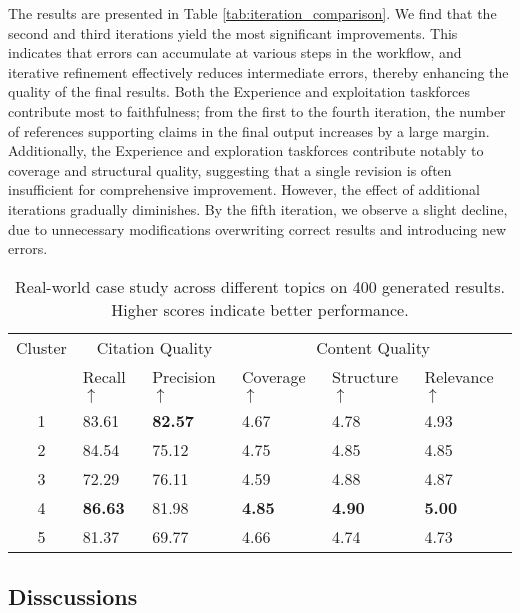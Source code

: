 \documentclass[manuscript,review,anonymous]{acmart}
\begin{document}
The results are presented in Table \ref{tab:iteration_comparison}. We find that the second and third iterations yield the most significant improvements. This indicates that errors can accumulate at various steps in the workflow, and iterative refinement effectively reduces intermediate errors, thereby enhancing the quality of the final results. Both the Experience and exploitation taskforces contribute most to faithfulness; from the first to the fourth iteration, the number of references supporting claims in the final output increases by a large margin. Additionally, the Experience and exploration taskforces contribute notably to coverage and structural quality, suggesting that a single revision is often insufficient for comprehensive improvement. However, the effect of additional iterations gradually diminishes. By the fifth iteration, we observe a slight decline, due to unnecessary modifications overwriting correct results and introducing new errors.

\begin{table}[]
    \centering
    \begin{tabular}{clllll}
    \toprule
    \multirow{2.5}{*}{Cluster} & \multicolumn{2}{c}{Citation Quality} & \multicolumn{3}{c}{Content Quality} \\
    \cmidrule(lr){2-3} \cmidrule(lr){4-6}
    & Recall $\uparrow$ & Precision $\uparrow$ & Coverage $\uparrow$ & Structure $\uparrow$ & Relevance $\uparrow$ \\
    \midrule
    1 & 83.61 & \textbf{82.57} & 4.67 & 4.78 & 4.93 \\
    2 & 84.54 & 75.12 & 4.75 & 4.85 & 4.85 \\
    3 & 72.29 & 76.11 & 4.59 & 4.88 & 4.87 \\
    4 & \textbf{86.63} & 81.98 & \textbf{4.85} & \textbf{4.90} & \textbf{5.00} \\
    5 & 81.37 & 69.77 & 4.66 & 4.74 & 4.73 \\
    \bottomrule
    \end{tabular}
    \caption{Real-world case study across different topics on 400 generated results. Higher scores indicate better performance.}
    \label{tab:cluster_comparison}
\end{table}

\subsection{Disscussions}
\end{document}
